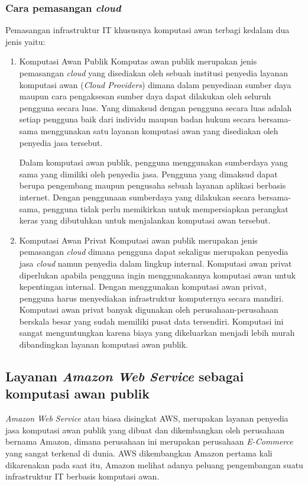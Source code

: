 \documentclass[pi.tex]{subfile}
\begin{document}
\subsubsection{Cara pemasangan \emph{cloud}}
Pemasangan infrastruktur IT khususnya komputasi awan terbagi kedalam dua jenis yaitu:

\begin{enumerate}
\item Komputasi Awan Publik
  Komputas awan publik merupakan jenis pemasangan \emph{cloud} yang disediakan oleh sebuah institusi penyedia layanan komputasi awan (\emph{Cloud Providers}) dimana dalam penyediaan sumber daya maupun cara pengaksesan sumber daya dapat dilakukan oleh seluruh pengguna secara luas. Yang dimaksud dengan pengguna secara luas adalah setiap pengguna baik dari individu maupun badan hukum secara bersama-sama menggunakan satu layanan komputasi awan yang disediakan oleh penyedia jasa tersebut.

  Dalam komputasi awan publik, pengguna menggunakan sumberdaya yang sama yang dimiliki oleh penyedia jasa. Pengguna yang dimaksud dapat berupa pengembang maupun pengusaha sebuah layanan aplikasi berbasis internet. Dengan penggunaan sumberdaya yang dilakukan secara bersama-sama, pengguna tidak perlu memikirkan untuk mempersiapkan perangkat keras yang dibutuhkan untuk menjalankan komputasi awan tersebut.
  
\item Komputasi Awan Privat
  Komputasi awan publik merupakan jenis pemasangan \emph{cloud} dimana pengguna dapat sekaligus merupakan penyedia jasa \emph{cloud} namun penyedia dalam lingkup internal. Komputasi awan privat diperlukan apabila pengguna ingin menggunakannya komputasi awan untuk kepentingan internal. Dengan menggunakan komputasi awan privat, pengguna harus menyediakan infrastruktur komputernya secara mandiri.
  Komputasi awan privat banyak digunakan oleh perusahaan-perusahaan berskala besar yang sudah memiliki pusat data tersendiri. Komputasi ini sangat menguntungkan karena biaya yang dikeluarkan menjadi lebih murah dibandingkan layanan komputasi awan publik.
\end{enumerate}
  

\subsection{Layanan \emph{Amazon Web Service} sebagai komputasi awan publik }

\emph{Amazon Web Service} atau biasa disingkat AWS, merupakan layanan penyedia jasa komputasi awan publik yang dibuat dan dikembangkan oleh perusahaan bernama Amazon, dimana perusahaan ini merupakan perusahaan \emph{E-Commerce} yang sangat terkenal di dunia. AWS dikembangkan Amazon pertama kali dikarenakan pada saat itu, Amazon melihat adanya peluang pengembangan suatu infrastruktur IT berbasis komputasi awan.
\end{document}
